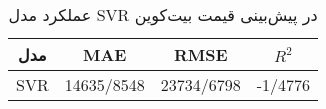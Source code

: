 
        \begin{table}[H]
            \centering
            \begin{tabular}{|c|c|c|c|}
                
                \hline
                \textbf{مدل} & \textbf{MAE} & \textbf{RMSE} & \textbf{ \(R^2\) } \\
                \hline

                SVR & 14635/8548 & 23734/6798 & -1/4776 \\

                \hline
            \end{tabular}
            \caption{عملکرد مدل SVR در پیش‌بینی قیمت بیت‌کوین}
            \label{tab:svr_performance}
        \end{table}
        